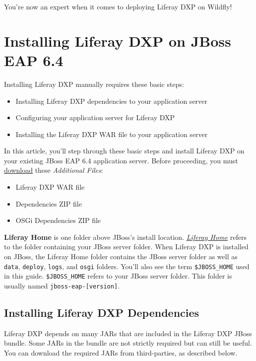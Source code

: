You're now an expert when it comes to deploying Liferay DXP on Wildfly!

\section{Installing Liferay DXP on JBoss EAP
6.4}\label{installing-liferay-dxp-on-jboss-eap-6.4}

Installing Liferay DXP manually requires these basic steps:

\begin{itemize}
\tightlist
\item
  Installing Liferay DXP dependencies to your application server
\item
  Configuring your application server for Liferay DXP
\item
  Installing the Liferay DXP WAR file to your application server
\end{itemize}

In this article, you'll step through these basic steps and install
Liferay DXP on your existing JBoss EAP 6.4 application server. Before
proceeding, you must \href{https://help.liferay.com/hc}{download} these
\emph{Additional Files}:

\begin{itemize}
\tightlist
\item
  Liferay DXP WAR file
\item
  Dependencies ZIP file
\item
  OSGi Dependencies ZIP file
\end{itemize}

\textbf{Liferay Home} is one folder above JBoss's install location.
\href{/docs/7-0/deploy/-/knowledge_base/d/installing-product\#liferay-home}{\emph{Liferay
Home}} refers to the folder containing your JBoss server folder. When
Liferay DXP is installed on JBoss, the Liferay Home folder contains the
JBoss server folder as well as \texttt{data}, \texttt{deploy},
\texttt{logs}, and \texttt{osgi} folders. You'll also see the term
\texttt{\$JBOSS\_HOME} used in this guide. \texttt{\$JBOSS\_HOME} refers
to your JBoss server folder. This folder is usually named
\texttt{jboss-eap-{[}version{]}}.

\subsection{Installing Liferay DXP
Dependencies}\label{installing-liferay-dxp-dependencies-2}

Liferay DXP depends on many JARs that are included in the Liferay DXP
JBoss bundle. Some JARs in the bundle are not strictly required but can
still be useful. You can download the required JARs from third-parties,
as described below.

